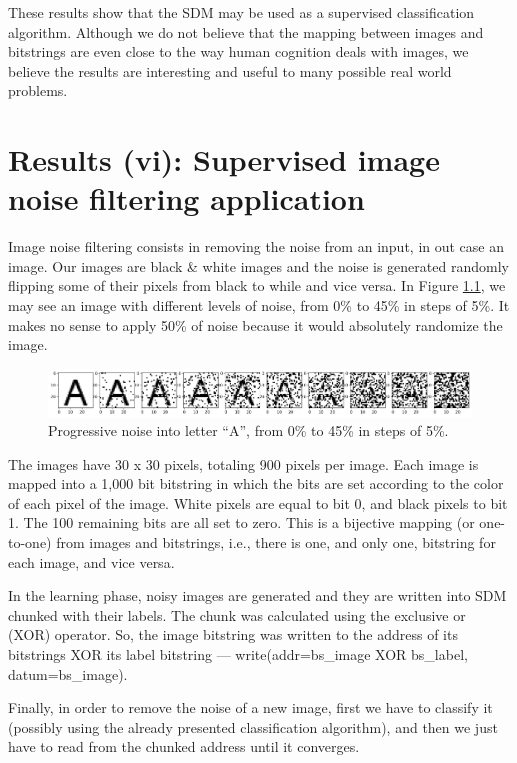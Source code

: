 These results show that the SDM may be used as a supervised classification algorithm. Although we do not believe that the mapping between images and bitstrings are even close to the way human cognition deals with images, we believe the results are interesting and useful to many possible real world problems.


\chapter{Results (vi): Supervised image noise filtering application}

Image noise filtering consists in removing the noise from an input, in out case an image. Our images are black \& white images and the noise is generated randomly flipping some of their pixels from black to while and vice versa. In Figure \ref{fig-filter-progressive-noise}, we may see an image with different levels of noise, from 0\% to 45\% in steps of 5\%. It makes no sense to apply 50\% of noise because it would absolutely randomize the image.

\begin{figure}[!htb]
\centering\includegraphics[width=\textwidth]{./images02/filter/progressive-noise.png}
\caption{Progressive noise into letter ``A'', from 0\% to 45\% in steps of 5\%.
\label{fig-filter-progressive-noise}}
\end{figure}

The images have 30 x 30 pixels, totaling 900 pixels per image. Each image is mapped into a 1,000 bit bitstring in which the bits are set according to the color of each pixel of the image. White pixels are equal to bit 0, and black pixels to bit 1. The 100 remaining bits are all set to zero. This is a bijective mapping (or one-to-one) from images and bitstrings, i.e., there is one, and only one, bitstring for each image, and vice versa.

In the learning phase, noisy images are generated and they are written into SDM chunked with their labels. The chunk was calculated using the exclusive or (XOR) operator. So, the image bitstring was written to the address of its bitstrings XOR its label bitstring --- write(addr=bs\_image XOR bs\_label, datum=bs\_image).

Finally, in order to remove the noise of a new image, first we have to classify it (possibly using the already presented classification algorithm), and then we just have to read from the chunked address until it converges.



